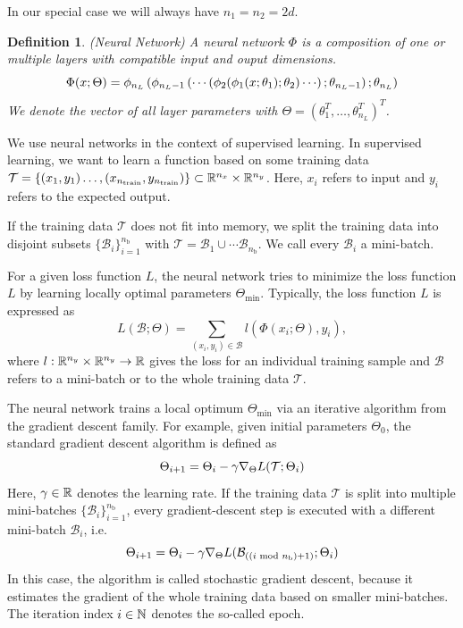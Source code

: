 \documentclass[twoside,a4paper]{article}
\newtheorem{definition}{Definition}
\begin{document}
In our special case we will always have $n_1 = n_2 = 2d$.

\begin{definition}
	(Neural Network)
	A neural network $\Phi$ is a composition of one or multiple layers with
	compatible input and ouput dimensions. 
	\begin{equation*}
		\Phi(x;\Theta) = \phi_{n_L} \lb \phi_{n_L-1} \lb \cdots
		\lb \phi_2(
		\phi_1(x;\theta_1); \theta_2 ) \cdots \rb ; \theta_{n_L-1} \rb ; \theta_{n_L} \rb
	\end{equation*}
	We denote the vector of all
	layer parameters with $\Theta = (\theta_1^T, \dots, \theta_{n_L}^T)^T$.
\end{definition}

We use neural networks in the context of supervised learning. 
In supervised learning, we want to learn a function based on some training data
$\mathcal{T} = \{(x_1, y_1) \dots, (x_{n_{\text{train}}},y_{n_{\text{train}}}) \}
\subset \R^{n_x} \times \R^{n_y}$. Here, $x_i$ refers to input
and $y_i$ refers to the expected output.

If the training data $\mathcal{T}$ does not fit into memory,
we split the training data into disjoint subsets
$\{ \mathcal{B}_i \}_{i=1}^{n_{\text{b}}}$ with
$\mathcal{T} = \mathcal{B}_1 \cup \cdots \mathcal{B}_{n_{\text{b}}}$.
We call every $\mathcal{B}_i$ a mini-batch.

For a given loss function $L$, the neural network tries to minimize the loss 
function $L$ by learning locally optimal parameters $\Theta_{\text{min}}$.
Typically, the loss function $L$ is expressed as
\begin{equation*}
	L(\mathcal{B}; \Theta) = \sum_{(x_i,y_i) \in \mathcal{B}} l(\Phi(x_i; \Theta), y_i),
\end{equation*}
where $l : \R^{n_y} \times \R^{n_y} \to \R$ gives the loss for an 
individual training sample and $\mathcal{B}$ refers to a mini-batch
or to the whole training data $\mathcal{T}$.

The neural network trains a local optimum $\Theta_{\text{min}}$ via
an iterative algorithm from the gradient descent family. For example, given
initial parameters $\Theta_0$, the standard gradient descent algorithm is defined as
\begin{equation*}
	\Theta_{i+1} = \Theta_i - \gamma \grad[\Theta]{L(\mathcal{T};\Theta_{i})}
\end{equation*}
Here, $\gamma \in \R$ denotes the learning rate.
If the training data $\mathcal{T}$ is split into multiple mini-batches 
$\{ \mathcal{B}_i \}_{i=1}^{n_{\text{b}}}$, every gradient-descent step
is executed with a different mini-batch $\mathcal{B}_i$, i.e.
\begin{equation*}
	\Theta_{i+1} = \Theta_i - \gamma \grad[\Theta]{L(
		\mathcal{B}_{((i \textrm{ mod } n_{\text{b}}) + 1)};
		\Theta_{i})}
\end{equation*}
In this case, the algorithm is called stochastic gradient descent, because it estimates
the gradient of the whole training data based on smaller mini-batches.
The iteration index $i \in \N$ denotes the so-called epoch.
\end{document}
